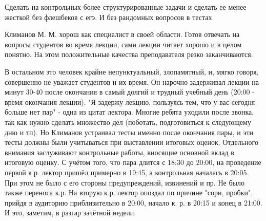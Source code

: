            \begin{commentbox} 
                Сделать на контрольных более структурированные задачи и сделать ее менее жесткой без флешбеков с егэ.  И без рандомных вопросов в тестах 
            \end{commentbox} 
        
            \begin{commentbox} 
                Климанов М. М. хорош как специалист в своей области. Готов отвечать на вопросы студентов во время лекции, сами лекции читает хорошо и в целом понятно. На этом положительные качества преподавателя резко заканчиваются. 
        
                В остальном это человек крайне непунктуальный, злопамятный, и, мягко говоря, совершенно не уважает студентов и их время. Он нарочно задерживал лекции на минут 30-40 после окончания в самый долгий и трудный учебный день (20:00 - время окончания лекции). "Я задержу лекцию, пользуясь тем, что у вас сегодня больше нет пар" - одна из цитат лектора. Многие ребята уходили после звонка, так как нужно сделать множество дел (поботать, подготовиться к следующему дню и тп). Но Климанов устраивал тесты именно после окончания пары, и эти тесты должны были учитываться при выставлении итоговых оценок. 
                Отдельного внимания заслуживают контрольные работы, вносящие основной вклад в итоговую оценку. С учётом того, что пара длится с 18:30 до 20:00, на проведение первой к.р. лектор пришёл примерно в 19:45, а контрольная началась в 20:05. При этом не было с его стороны предупреждений, извинений и пр. Не было также переноса к.р. На вторую к.р. лектор опоздал по причине "сори, пробки", прийдя в аудиторию приблизительно в 20:00, начало к. р. в 20:15 и конец в 21:00. И это, заметим, в разгар зачётной недели.  
            \end{commentbox} 
        
